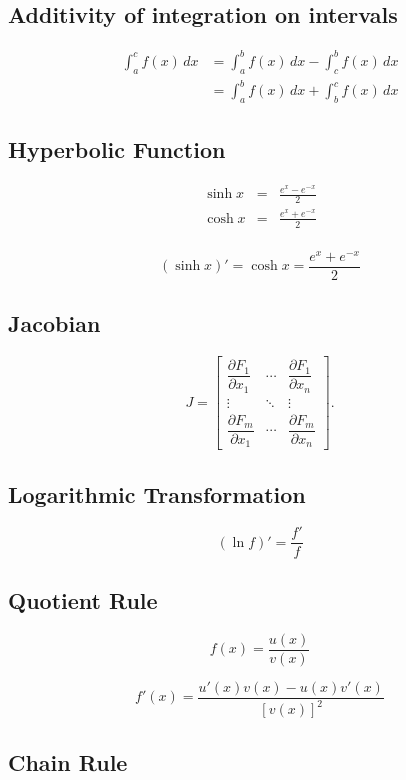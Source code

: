 \documentclass[12pt, a4paper]{article}
\begin{document}
\subsection*{Additivity of integration on intervals}
\begin{eqnarray*}
 \int_a^c f(x) \, dx &{}= \int_a^b f(x) \, dx - \int_c^b f(x) \, dx \\
 &{} = \int_a^b f(x) \, dx + \int_b^c f(x) \, dx
\end{eqnarray*}

\subsection*{Hyperbolic Function}

\begin{eqnarray*}
   \sinh x  & =& \frac{e^x - e^{-x}}{2} \\
   \cosh x  & = & \frac{e^x + e^{-x}}{2} \\
\end{eqnarray*}

\[( \sinh x )'= \cosh x = \frac{e^x + e^{-x}}{2}\]


\subsection*{Jacobian}
\[J=\begin{bmatrix} \dfrac{\partial F_1}{\partial x_1} & \cdots & \dfrac{\partial F_1}{\partial x_n} \\ \vdots & \ddots & \vdots \\ \dfrac{\partial F_m}{\partial x_1} & \cdots & \dfrac{\partial F_m}{\partial x_n}  \end{bmatrix}.\]


\subsection*{Logarithmic Transformation}
\[ (\ln f)'= \frac{f'}{f}\]
\subsection*{Quotient Rule}

\[f(x) = \frac{u(x)}{v(x)}\]


\[f'(x) = \frac{u'(x)v(x) - u(x)v'(x)}{[v(x)]^2}\]
\subsection*{Chain Rule}
\end{document}
